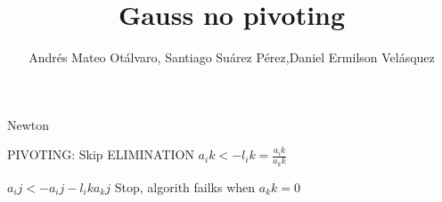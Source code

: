 \documentclass{article}
\title{Gauss no pivoting}
\author{Andrés Mateo Otálvaro, Santiago Suárez Pérez,Daniel Ermilson Velásquez}
\begin{document}
\maketitle
\begin{algorithm}
\caption{Newton}\label{numerical methods}
\begin{algorithmic}[1]
  \State PIVOTING: Skip
  \State ELIMINATION
      \State $a_ik <- l_ik = \frac{a_ik}{a_kk}$

     \EndFor
        \State $a_ij <- a_ij - l_ik a_kj$
        \EndFor
       \EndFor 
  \Else
   \State Stop, algorith failks when $a_kk=0$
  \EndIf 
  \EndFor
\EndProcedure
\end{algorithmic}
\end{algorithm}
\end{document}
